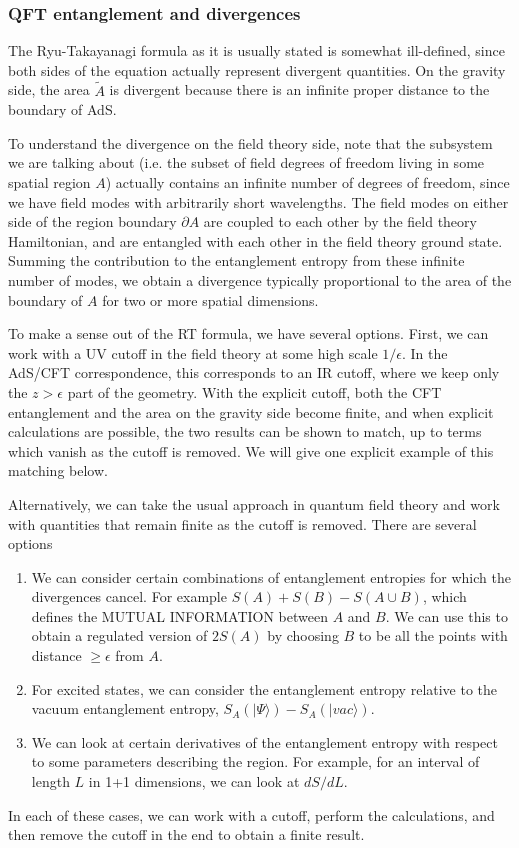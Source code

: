 \documentclass[12pt,epsf]{article}
\begin{document}
\subsubsection*{QFT entanglement and divergences}

The Ryu-Takayanagi formula as it is usually stated is somewhat ill-defined, since both sides of the equation actually represent divergent quantities. On the gravity side, the area $\tilde{A}$ is divergent because there is an infinite proper distance to the boundary of AdS.

To understand the divergence on the field theory side, note that the subsystem we are talking about (i.e. the subset of field degrees of freedom living in some spatial region $A$) actually contains an infinite number of degrees of freedom, since we have field modes with arbitrarily short wavelengths. The field modes on either side of the region boundary $\partial A$ are coupled to each other by the field theory Hamiltonian, and are entangled with each other in the field theory ground state. Summing the contribution to the entanglement entropy from these infinite number of modes, we obtain a divergence typically proportional to the area of the boundary of $A$ for two or more spatial dimensions.

To make a sense out of the RT formula, we have several options. First, we can work with a UV cutoff in the field theory at some high scale $1/\epsilon$. In the AdS/CFT correspondence, this corresponds to an IR cutoff, where we keep only the $z > \epsilon$ part of the geometry. With the explicit cutoff, both the CFT entanglement and the area on the gravity side become finite, and when explicit calculations are possible, the two results can be shown to match, up to terms which vanish as the cutoff is removed. We will give one explicit example of this matching below.

Alternatively, we can take the usual approach in quantum field theory and work with quantities that remain finite as the cutoff is removed. There are several options
\begin{enumerate}
\item
We can consider certain combinations of entanglement entropies for which the divergences cancel. For example $S(A) + S(B) - S(A \cup B)$, which defines the MUTUAL INFORMATION between $A$ and $B$. We can use this to obtain a regulated version of $2 S(A)$ by choosing $B$ to be all the points with distance $\ge \epsilon$ from $A$.
\item
For excited states, we can consider the entanglement entropy relative to the vacuum entanglement entropy, $S_A(|\Psi \rangle) - S_A(|vac \rangle)$.
\item
We can look at certain derivatives of the entanglement entropy with respect to some parameters describing the region. For example, for an interval of length $L$ in 1+1 dimensions, we can look at $dS/dL$.
\end{enumerate}
In each of these cases, we can work with a cutoff, perform the calculations, and then remove the cutoff in the end to obtain a finite result.
\end{document}
